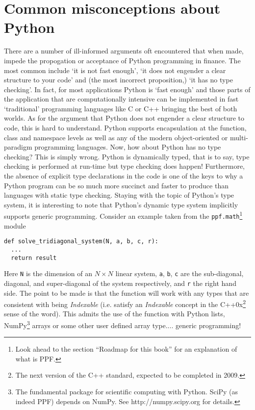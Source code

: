 \section{Common misconceptions about
Python}\label{sec:common-misconceptions-about-python}

There are a number of ill-informed arguments oft encountered that when
made, impede the propogation or acceptance of Python programming in
finance. The most common include `it is not fast enough', `it does not
engender a clear structure to your code' and (the most incorrect
proposition,) `it has no type checking'. In fact, for most
applications Python is `fast enough' and those parts of the
application that are computationally intensive can be implemented in
fast `traditional' programming languages like C or C++ bringing the
best of both worlds. As for the argument that Python does not engender
a clear structure to code, this is hard to understand. Python supports
encapsulation at the function, class and namespace levels as well as
any of the modern object-oriented or multi-paradigm programming
languages. Now, how about Python has no type checking?  This is simply
wrong. Python is dynamically typed, that is to say, type checking is
performed at run-time but type checking does happen! Furthermore, the
absence of explicit type declarations in the code is one of the keys
to why a Python program can be so much more succinct and faster to
produce than languages with static type checking. Staying with the
topic of Python's type system, it is interesting to note that Python's
dynamic type system implicitly supports generic programming. Consider
an example taken from the \verb|ppf.math|\footnote{Look ahead to the
section ``Roadmap for this
book'' for an explanation of what is PPF.} module
\begin{verbatim} 
def solve_tridiagonal_system(N, a, b, c, r):  
  ...
  return result
\end{verbatim}
Here \verb|N| is the dimension of an $N \times N$ linear system,
\verb|a|, \verb|b|, \verb|c| are the sub-diagonal, diagonal, and
super-diagonal of the system respectively, and \verb|r| the right hand
side. The point to be made is that the function will work with any
types that are consistent with being \emph{Indexable} (i.e. satisfy an
\emph{Indexable} concept in the C++0x\footnote{The next version of the
C++ standard, expected to be completed in 2009.} sense of the
word). This admits the use of the function with Python lists,
NumPy\footnote{The fundamental package for scientific computing with
Python. SciPy (as indeed PPF) depends on NumPy. See
http://numpy.scipy.org for details.} arrays or some other user defined
array type.... generic programming!

